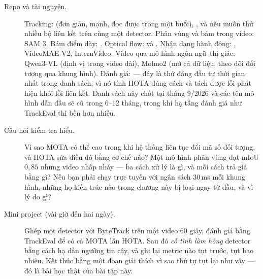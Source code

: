 \documentclass[../../deep_learning.tex]{subfiles}
\begin{document}
\begin{description}
\item[Repo và tài nguyên.] Tracking:  (đơn giản, mạnh, đọc được trong một buổi), , và  nếu muốn thử nhiều bộ liên kết trên cùng một detector. Phân vùng và bám trong video: SAM 3. Bám điểm dày: . Optical flow:  và . Nhận dạng hành động: , VideoMAE-V2, InternVideo. Video qua mô hình ngôn ngữ--thị giác: Qwen3-VL (định vị trong video dài), Molmo2 (mở cả dữ liệu, theo dõi đối tượng qua khung hình). Đánh giá:  --- đây là thứ đáng đầu tư thời gian nhất trong danh sách, vì nó tính HOTA đúng cách và tách được lỗi phát hiện khỏi lỗi liên kết. Danh sách này chốt tại tháng 9/2026 và các tên mô hình dẫn đầu sẽ cũ trong 6--12 tháng, trong khi hạ tầng đánh giá như TrackEval thì bền hơn nhiều.
\item[Câu hỏi kiểm tra hiểu.] Vì sao MOTA có thể cao trong khi hệ thống liên tục đổi mã số đối tượng, và HOTA sửa điều đó bằng cơ chế nào? Một mô hình phân vùng đạt mIoU \(0{,}85\) nhưng video nhấp nháy --- ba cách xử lý là gì, và mỗi cách trả giá bằng gì? Nếu bạn phải chạy trực tuyến với ngân sách 30\,ms mỗi khung hình, những họ kiến trúc nào trong chương này bị loại ngay từ đầu, và vì lý do gì?
\item[Mini project (vài giờ đến hai ngày).] Ghép một detector với ByteTrack trên một video 60 giây, đánh giá bằng TrackEval để có cả MOTA lẫn HOTA. Sau đó \emph{cố tình làm hỏng} detector bằng cách hạ dần ngưỡng tin cậy, và ghi lại metric nào tụt trước, tụt bao nhiêu. Kết thúc bằng một đoạn giải thích vì sao thứ tự tụt lại như vậy --- đó là bài học thật của bài tập này.
\end{description}
\end{document}
